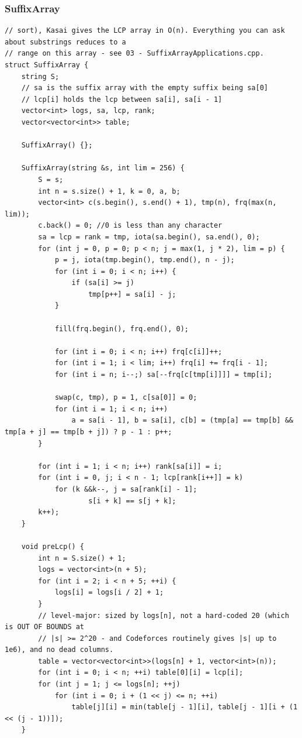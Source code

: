 \documentclass[9pt,a4paper,twocolumn]{extarticle}
\begin{document}
\filbreak
\subsubsection{SuffixArray}
\nopagebreak
\begin{lstlisting}
// sort), Kasai gives the LCP array in O(n). Everything you can ask about substrings reduces to a
// range on this array - see 03 - SuffixArrayApplications.cpp.
struct SuffixArray {
    string S;
    // sa is the suffix array with the empty suffix being sa[0]
    // lcp[i] holds the lcp between sa[i], sa[i - 1]
    vector<int> logs, sa, lcp, rank;
    vector<vector<int>> table;

    SuffixArray() {};

    SuffixArray(string &s, int lim = 256) {
        S = s;
        int n = s.size() + 1, k = 0, a, b;
        vector<int> c(s.begin(), s.end() + 1), tmp(n), frq(max(n, lim));
        c.back() = 0; //0 is less than any character
        sa = lcp = rank = tmp, iota(sa.begin(), sa.end(), 0);
        for (int j = 0, p = 0; p < n; j = max(1, j * 2), lim = p) {
            p = j, iota(tmp.begin(), tmp.end(), n - j);
            for (int i = 0; i < n; i++) {
                if (sa[i] >= j)
                    tmp[p++] = sa[i] - j;
            }

            fill(frq.begin(), frq.end(), 0);

            for (int i = 0; i < n; i++) frq[c[i]]++;
            for (int i = 1; i < lim; i++) frq[i] += frq[i - 1];
            for (int i = n; i--;) sa[--frq[c[tmp[i]]]] = tmp[i];

            swap(c, tmp), p = 1, c[sa[0]] = 0;
            for (int i = 1; i < n; i++)
                a = sa[i - 1], b = sa[i], c[b] = (tmp[a] == tmp[b] && tmp[a + j] == tmp[b + j]) ? p - 1 : p++;
        }

        for (int i = 1; i < n; i++) rank[sa[i]] = i;
        for (int i = 0, j; i < n - 1; lcp[rank[i++]] = k)
            for (k &&k--, j = sa[rank[i] - 1];
                    s[i + k] == s[j + k];
        k++);
    }

    void preLcp() {
        int n = S.size() + 1;
        logs = vector<int>(n + 5);
        for (int i = 2; i < n + 5; ++i) {
            logs[i] = logs[i / 2] + 1;
        }
        // level-major: sized by logs[n], not a hard-coded 20 (which is OUT OF BOUNDS at
        // |s| >= 2^20 - and Codeforces routinely gives |s| up to 1e6), and no dead columns.
        table = vector<vector<int>>(logs[n] + 1, vector<int>(n));
        for (int i = 0; i < n; ++i) table[0][i] = lcp[i];
        for (int j = 1; j <= logs[n]; ++j)
            for (int i = 0; i + (1 << j) <= n; ++i)
                table[j][i] = min(table[j - 1][i], table[j - 1][i + (1 << (j - 1))]);
    }


\end{lstlisting}
\end{document}
